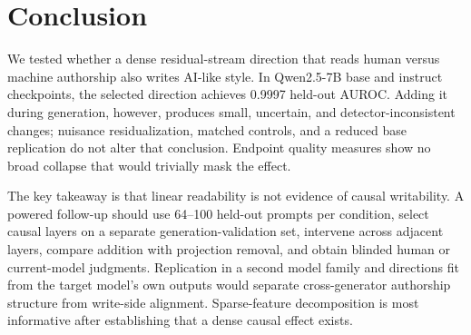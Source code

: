 \section{Conclusion}
\label{sec:conclusion}

We tested whether a dense residual-stream direction that reads human versus machine authorship also writes AI-like style. In Qwen2.5-7B base and instruct checkpoints, the selected direction achieves 0.9997 held-out AUROC. Adding it during generation, however, produces small, uncertain, and detector-inconsistent changes; nuisance residualization, matched controls, and a reduced base replication do not alter that conclusion. Endpoint quality measures show no broad collapse that would trivially mask the effect.

The key takeaway is that linear readability is not evidence of causal writability. A powered follow-up should use 64--100 held-out prompts per condition, select causal layers on a separate generation-validation set, intervene across adjacent layers, compare addition with projection removal, and obtain blinded human or current-model judgments. Replication in a second model family and directions fit from the target model's own outputs would separate cross-generator authorship structure from write-side alignment. Sparse-feature decomposition is most informative after establishing that a dense causal effect exists.

